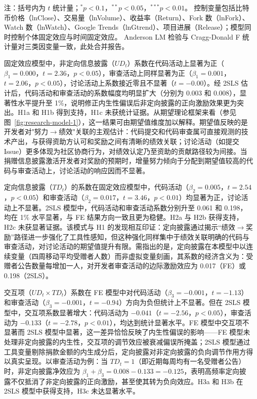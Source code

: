 \documentclass[
    type = master, %
    degree = professional,        %
    decl-page,  %
    twoside,                %
    fontset = fandol %
  ]{njuthesis}
\begin{document}
\begin{table}[htbp]
\begin{tabularx}{\textwidth}{Xrrrrrr}
        \bottomrule
    \end{tabularx}
    \begin{minipage}{\textwidth}
        \vspace{0.3em}
        \footnotesize 注：括号内为 $t$ 统计量；$^{*}p<0.1$，$^{**}p<0.05$，$^{***}p<0.01$。
        控制变量包括比特币价格（lnClose）、交易量（lnVolume）、收益率（Return）、Fork 数（lnFork）、Watch 数（lnWatch）、Google Trends（lnGtrend）、项目进展（Release）；模型同时控制个体固定效应与时间固定效应。
        Anderson LM 检验与 Cragg-Donald F 统计量对三类因变量一致，此处合并报告。
    \end{minipage}
\end{table}

固定效应模型中，非定向信息披露（$UD_t$）系数在代码活动上显著为正（$\beta_1 = 0.000$，$t = 2.36$，$p < 0.05$），审查活动上同样显著为正（$\beta_1 = 0.001$，$t = 2.06$，$p < 0.05$），讨论活动上系数接近零且不显著（$t = -0.00$）。经 2SLS 估计后，代码活动和审查活动的系数幅度均明显扩大（分别为 0.003 和 0.008），显著性水平提升至 1\%，说明修正内生性偏误后非定向披露的正向激励效果更为突出。H1a 和 H1b 得到支持，H1c 未获统计证据。从期望理论框架来看（参见图~\ref{fig:research-model-1}），这一结果可由期望值维度加以解释。期望值反映的是开发者对"努力$\to$绩效"关联的主观估计：代码提交和代码审查属可直接观测的技术产出，与获得资助方认可和奖励之间有清晰的绩效关联；讨论活动（如提交 Issue）更多体现为社区协商行为，对绩效认定乃至资助的贡献路径较为间接。当捐赠信息披露激活开发者对奖励的预期时，增量努力倾向于分配到期望值较高的代码与审查活动上，讨论活动的响应因而不显著。

定向信息披露（$TD_t$）的系数在固定效应模型中，代码活动（$\beta_2 = 0.005$，$t = 2.54$，$p < 0.05$）和审查活动（$\beta_2 = 0.017$，$t = 3.46$，$p < 0.01$）均显著为正，讨论活动上不显著。2SLS 模型中，代码活动和审查活动系数分别升至 0.061 和 0.198，均在 1\% 水平显著，与 FE 结果方向一致且更为稳健。H2a 与 H2b 获得支持，H2c 未获显著证据。该模式与 H1 的发现相互印证：定向披露通过揭示“绩效$\to$奖励”路径进一步强化了工具性感知，但这种强化同样集中于绩效关联明确的代码与审查活动，对讨论活动的期望值提升有限。需指出的是，定向披露在本模型中以连续变量（四周移动平均受赠者人数）而非虚拟变量刻画，其系数的经济含义为：受赠者公告数量每增加一人，对开发者审查活动的边际激励效应为 0.017（FE）或 0.198（2SLS）。

交互项（$UD_t \times TD_t$）系数在 FE 模型中对代码活动（$\beta_3 = -0.001$，$t = -1.13$）和审查活动（$\beta_3 = -0.001$，$t = -0.94$）方向为负但统计上不显著。但在 2SLS 模型中，交互项系数显著增大：代码活动为 $-0.041$（$t = -2.56$，$p < 0.05$），审查活动为 $-0.133$（$t = -2.78$，$p < 0.01$），均达到统计显著水平。FE 模型中交互项不显著而 2SLS 模型中显著，这一差异恰恰反映了内生性偏误的影响——FE 模型未处理非定向披露的内生性，交互项的调节效应被衰减偏误所掩盖；2SLS 模型通过工具变量剔除捐款金额的内生成分后，定向披露对非定向披露的负向调节作用方得以真实呈现。以审查活动为例：当 $TD_t = 1$（即近期每周均有一名受赠者公告）时，非定向披露净效应为 $\beta_1 + \beta_3 = 0.008 - 0.133 = -0.125$，表明高频率定向披露不仅抵消了非定向披露的正向激励，甚至使其转为负向效应。H3a 和 H3b 在 2SLS 模型中获得支持，H3c 未达显著水平。
\end{document}
